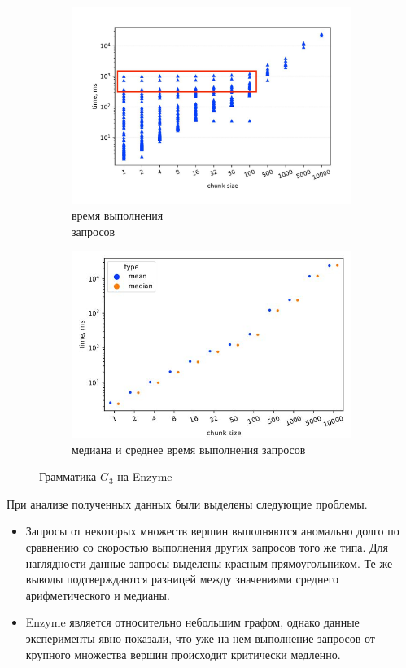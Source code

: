 \documentclass[14pt]{matmex-diploma-custom}
\theoremstyle{definition}
\begin{document}
    \begin{figure}[H]
        \begin{subfigure}[b]{0.5\textwidth}
    \centering
    \includegraphics[width=\columnwidth]{pics/bt_old.pdf_1.jpg}  \caption{время выполнения \\ запросов}
    \label{5}
    \end{subfigure}%
    \begin{subfigure}[b]{0.5\textwidth}
    \centering
    \includegraphics[width=\textwidth]{pics/bt_old_mean&median.pdf_1.jpg} \caption{медиана и среднее время выполнения запросов}
    \label{6}
    \end{subfigure} \caption{Грамматика $G_3$ на Enzyme}
\label{old}
\end{figure}

При анализе полученных данных были выделены следующие проблемы.
 \begin{itemize}
     \item Запросы от некоторых множеств вершин выполняются аномально долго по сравнению со скоростью выполнения других запросов того же типа. Для наглядности данные запросы выделены красным прямоугольником. Те же выводы подтверждаются разницей между значениями среднего арифметического и медианы.
     \item Enzyme является относительно небольшим графом, однако данные эксперименты явно показали, что уже на нем выполнение запросов от крупного множества вершин происходит критически медленно.
 \end{itemize} 
 
\end{document}
